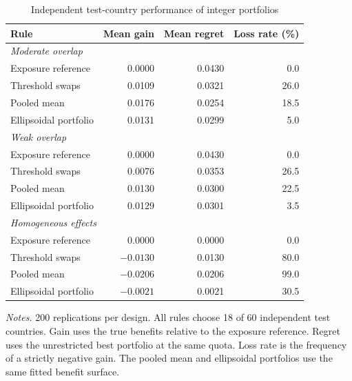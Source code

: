 \begin{table}[htbp]
\centering
\small
\caption{Independent test-country performance of integer portfolios}
\label{tab:ellipsoid_simulation}
\begin{tabular}{lrrr}
\toprule
Rule & Mean gain & Mean regret & Loss rate (\%) \\
\midrule
\multicolumn{4}{l}{\emph{Moderate overlap}} \\
Exposure reference & 0.0000 & 0.0430 & 0.0 \\
Threshold swaps & 0.0109 & 0.0321 & 26.0 \\
Pooled mean & 0.0176 & 0.0254 & 18.5 \\
Ellipsoidal portfolio & 0.0131 & 0.0299 & 5.0 \\
\midrule
\multicolumn{4}{l}{\emph{Weak overlap}} \\
Exposure reference & 0.0000 & 0.0430 & 0.0 \\
Threshold swaps & 0.0076 & 0.0353 & 26.5 \\
Pooled mean & 0.0130 & 0.0300 & 22.5 \\
Ellipsoidal portfolio & 0.0129 & 0.0301 & 3.5 \\
\midrule
\multicolumn{4}{l}{\emph{Homogeneous effects}} \\
Exposure reference & 0.0000 & 0.0000 & 0.0 \\
Threshold swaps & $-0.0130$ & 0.0130 & 80.0 \\
Pooled mean & $-0.0206$ & 0.0206 & 99.0 \\
Ellipsoidal portfolio & $-0.0021$ & 0.0021 & 30.5 \\
\bottomrule
\end{tabular}
\begin{minipage}{0.9\textwidth}\footnotesize\smallskip
\emph{Notes.} 200 replications per design. All rules choose 18 of 60 independent test
countries. Gain uses the true benefits relative to the exposure reference. Regret
uses the unrestricted best portfolio at the same quota. Loss rate is the frequency
of a strictly negative gain. The pooled mean and ellipsoidal portfolios use the
same fitted benefit surface.
\end{minipage}
\end{table}
